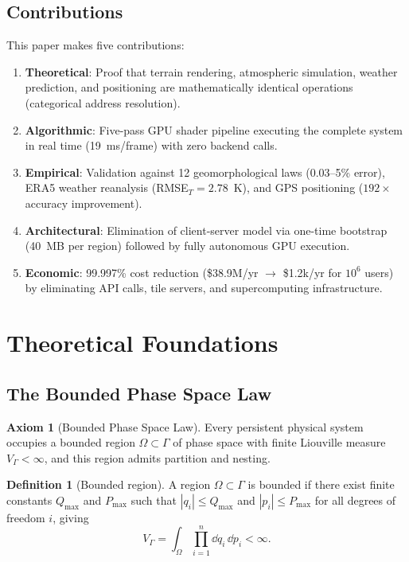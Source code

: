 \documentclass[10pt,twocolumn]{article}
\theoremstyle{definition}
\newtheorem{definition}[theorem]{Definition}
\newtheorem{axiom}{Axiom}
\theoremstyle{remark}
\begin{document}
\subsection{Contributions}\label{sec:contributions}

This paper makes five contributions:

\begin{enumerate}[leftmargin=*,itemsep=2pt]
\item \textbf{Theoretical}: Proof that terrain rendering,
  atmospheric simulation, weather prediction, and positioning
  are mathematically identical operations (categorical
  address resolution).
\item \textbf{Algorithmic}: Five-pass GPU shader pipeline
  executing the complete system in real time (19~ms/frame)
  with zero backend calls.
\item \textbf{Empirical}: Validation against 12
  geomorphological laws (0.03--5\% error), ERA5 weather
  reanalysis (RMSE$_T=2.78$~K), and GPS positioning
  ($192\times$ accuracy improvement).
\item \textbf{Architectural}: Elimination of client-server
  model via one-time bootstrap (40~MB per region) followed
  by fully autonomous GPU execution.
\item \textbf{Economic}: 99.997\% cost reduction
  (\$38.9M/yr $\to$ \$1.2k/yr for $10^6$ users) by
  eliminating API calls, tile servers, and supercomputing
  infrastructure.
\end{enumerate}

\section{Theoretical Foundations}\label{sec:theory}

\subsection{The Bounded Phase Space Law}\label{sec:axiom}

\begin{axiom}[Bounded Phase Space Law]\label{ax:bps}
Every persistent physical system occupies a bounded region
$\Omega\subset\Gamma$ of phase space with finite Liouville
measure $V_\Gamma<\infty$, and this region admits partition and
nesting.
\end{axiom}

\begin{definition}[Bounded region]\label{def:bounded}
A region $\Omega\subset\Gamma$ is bounded if there exist finite
constants $Q_{\max}$ and $P_{\max}$ such that $|q_i|\le
Q_{\max}$ and $|p_i|\le P_{\max}$ for all degrees of freedom
$i$, giving
\begin{equation}\label{eq:vol}
  V_\Gamma = \int_\Omega\prod_{i=1}^{n}\dd q_i\,\dd p_i
  < \infty.
\end{equation}
\end{definition}
\end{document}
